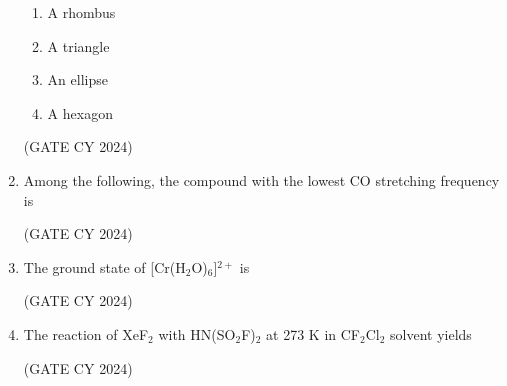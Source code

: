 \documentclass[12pt]{article}
\begin{document}
\begin{enumerate}
\begin{enumerate}
\item A rhombus
\item A triangle
\item An ellipse
\item A hexagon
\end{enumerate}
\hfill (GATE CY 2024)

\item Among the following, the compound with the lowest CO stretching frequency is
\begin{enumerate}
\end{enumerate}
\hfill (GATE CY 2024)

\item The ground state of [Cr(H$_2$O)$_6$]$^{2+}$ is
\begin{enumerate}
\end{enumerate}
\hfill (GATE CY 2024)

\item The reaction of XeF$_2$ with HN(SO$_2$F)$_2$ at 273 K in CF$_2$Cl$_2$ solvent yields
\begin{enumerate}
\end{enumerate}
\hfill (GATE CY 2024)


\end{enumerate}
\end{document}
